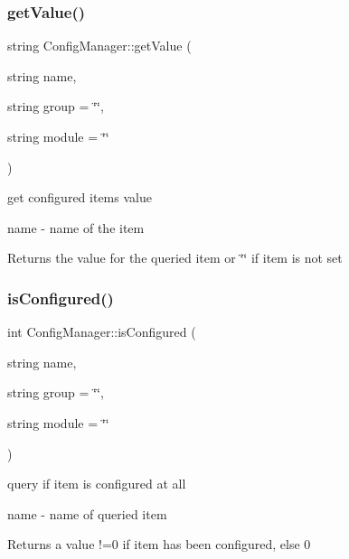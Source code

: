 \subsubsection{\texorpdfstring{get\+Value()}{getValue()}}
{\footnotesize\ttfamily string Config\+Manager\+::get\+Value (\begin{DoxyParamCaption}\item[{string}]{name,  }\item[{string}]{group = {\ttfamily \char`\"{}\char`\"{}},  }\item[{string}]{module = {\ttfamily \char`\"{}\char`\"{}} }\end{DoxyParamCaption})}



get configured item\textquotesingle{}s value 

\begin{DoxyItemize}
\item {\ttfamily name} -\/ name of the item \begin{DoxyReturn}{Returns}
the value for the queried item or \char`\"{}\char`\"{} if item is not set 
\end{DoxyReturn}
\end{DoxyItemize}
\mbox{\label{classConfigManager_ae065527722202c0c34d2e775774e27b0}} 
\subsubsection{\texorpdfstring{is\+Configured()}{isConfigured()}}
{\footnotesize\ttfamily int Config\+Manager\+::is\+Configured (\begin{DoxyParamCaption}\item[{string}]{name,  }\item[{string}]{group = {\ttfamily \char`\"{}\char`\"{}},  }\item[{string}]{module = {\ttfamily \char`\"{}\char`\"{}} }\end{DoxyParamCaption})}



query if item is configured at all 

\begin{DoxyItemize}
\item {\ttfamily name} -\/ name of queried item \begin{DoxyReturn}{Returns}
a value !=0 if item has been configured, else 0 
\end{DoxyReturn}
\end{DoxyItemize}
\mbox{\label{classConfigManager_a217e3864c2c7afe3a340df6405d56a55}} 
